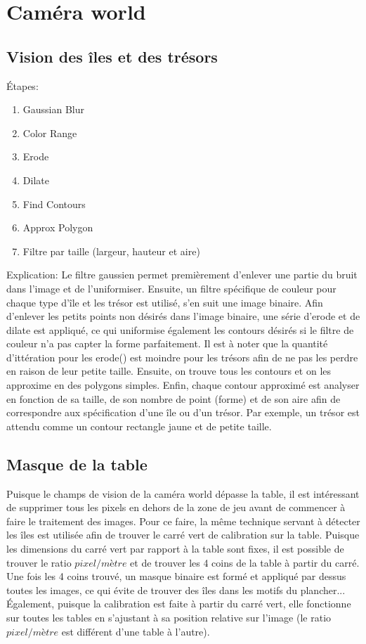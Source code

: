 \section{Caméra world} 

\subsection{Vision des îles et des trésors}

Étapes:
\begin{enumerate}
\item Gaussian Blur
\item Color Range
\item Erode
\item Dilate
\item Find Contours
\item Approx Polygon
\item Filtre par taille (largeur, hauteur et aire)
\end{enumerate}


Explication: Le filtre gaussien permet premièrement d'enlever une partie du bruit dans l'image et de l'uniformiser. Ensuite, un filtre spécifique de couleur pour chaque type d'île et les trésor est utilisé, s'en suit une image binaire. Afin d'enlever les petits points non désirés dans l'image binaire, une série d'erode et de dilate est appliqué, ce qui uniformise également les contours désirés si le filtre de couleur n'a pas capter la forme parfaitement. Il est à noter que la quantité d'ittération pour les erode() est moindre pour les trésors afin de ne pas les perdre en raison de leur petite taille. Ensuite, on trouve tous les contours et on les approxime en des polygons simples. Enfin, chaque contour approximé est analyser en fonction de sa taille, de son nombre de point (forme) et de son aire afin de correspondre aux spécification d'une île ou d'un trésor.  Par exemple, un trésor est attendu comme un contour rectangle jaune et de petite taille.

\subsection{Masque de la table}

Puisque le champs de vision de la caméra world dépasse la table, il est intéressant de supprimer tous les pixels en dehors de la zone de jeu avant de commencer à faire le traitement des images. Pour ce faire, la même technique servant à détecter les îles est utilisée afin de trouver le carré vert de calibration sur la table. Puisque les dimensions du carré vert par rapport à la table sont fixes, il est possible de trouver le ratio $pixel/mètre$ et de trouver les 4 coins de la table à partir du carré. Une fois les 4 coins trouvé, un masque binaire est formé et appliqué par dessus toutes les images, ce qui évite de trouver des îles dans les motifs du plancher... Également, puisque la calibration est faite à partir du carré vert, elle fonctionne sur toutes les tables en s'ajustant à sa position relative sur l'image (le ratio $pixel/mètre$ est différent d'une table à l'autre).


